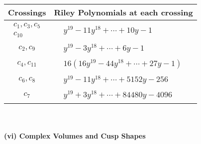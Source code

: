 \documentclass[1p]{elsarticle_modified}
\theoremstyle{definition}
\begin{document}
\begin{tabular}{m{50pt}|m{274pt}}
Crossings & \hspace{64pt}Riley Polynomials at each crossing \\
\hline $$\begin{aligned}c_{1},c_{3},c_{5}\\c_{10}\end{aligned}$$&$\begin{aligned}
&y^{19}-11 y^{18}+\cdots+10 y-1
\end{aligned}$\\
\hline $$\begin{aligned}c_{2},c_{9}\end{aligned}$$&$\begin{aligned}
&y^{19}-3 y^{18}+\cdots+6 y-1
\end{aligned}$\\
\hline $$\begin{aligned}c_{4},c_{11}\end{aligned}$$&$\begin{aligned}
&16(16 y^{19}-44 y^{18}+\cdots+27 y-1)
\end{aligned}$\\
\hline $$\begin{aligned}c_{6},c_{8}\end{aligned}$$&$\begin{aligned}
&y^{19}-11 y^{18}+\cdots+5152 y-256
\end{aligned}$\\
\hline $$\begin{aligned}c_{7}\end{aligned}$$&$\begin{aligned}
&y^{19}+3 y^{18}+\cdots+84480 y-4096
\end{aligned}$\\
\hline
\end{tabular}\\~\\
\newpage\flushleft \textbf{(vi) Complex Volumes and Cusp Shapes}
\end{document}

